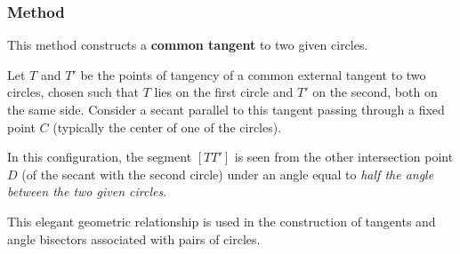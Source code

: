 \begin{minipage}{.5\textwidth}
\begin{center}
\end{center}

\end{minipage}
\begin{minipage}{.5\textwidth}
\begin{tkzexample}
\end{tkzexample}
\end{minipage}



\subsubsection{Method } %
\label{ssub:common_tangent}

This method constructs a \textbf{common tangent} to two given circles.

\medskip
\noindent
Let $T$ and $T'$ be the points of tangency of a common external tangent to two circles, chosen such that $T$ lies on the first circle and $T'$ on the second, both on the same side. Consider a secant parallel to this tangent passing through a fixed point $C$ (typically the center of one of the circles).

\medskip
\noindent
In this configuration, the segment $[TT']$ is seen from the other intersection point $D$ (of the secant with the second circle) under an angle equal to \emph{half the angle between the two given circles}.

\medskip
\noindent
This elegant geometric relationship is used in the construction of tangents and angle bisectors associated with pairs of circles.

